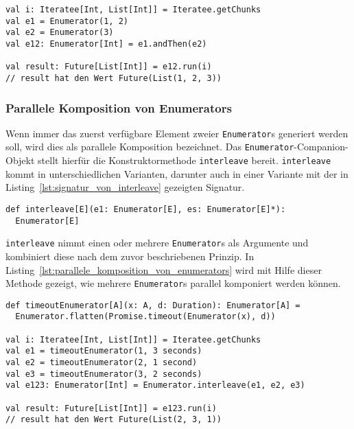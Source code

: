 \begin{lstlisting}[caption=Sequentielle Komposition von Enumerators, label=lst:sequentielle_komposition_von_enumerators]
val i: Iteratee[Int, List[Int]] = Iteratee.getChunks
val e1 = Enumerator(1, 2)
val e2 = Enumerator(3)
val e12: Enumerator[Int] = e1.andThen(e2)

val result: Future[List[Int]] = e12.run(i)
// result hat den Wert Future(List(1, 2, 3))
\end{lstlisting}


\subsubsection{Parallele Komposition von Enumerators} %
\label{ssub:anwendung_parallele_komposition_von_enumerators}

Wenn immer das zuerst verfügbare Element zweier \lstinline|Enumerator|s generiert werden soll, wird dies als parallele Komposition bezeichnet.
Das \lstinline|Enumerator|-Companion-Objekt stellt hierfür die Konstruktormethode \lstinline|interleave| bereit.
\lstinline|interleave| kommt in unterschiedlichen Varianten, darunter auch in einer Variante mit der in Listing~\ref{lst:signatur_von_interleave} gezeigten Signatur.

\begin{lstlisting}[caption=Die Signatur von interleave, label=lst:signatur_von_interleave]
def interleave[E](e1: Enumerator[E], es: Enumerator[E]*):
  Enumerator[E]
\end{lstlisting}

\lstinline|interleave| nimmt einen oder mehrere \lstinline|Enumerator|s als Argumente und kombiniert diese nach dem zuvor beschriebenen Prinzip.
In Listing~\ref{lst:parallele_komposition_von_enumerators} wird mit Hilfe dieser Methode gezeigt, wie mehrere \lstinline|Enumerator|s parallel komponiert werden können.

\begin{lstlisting}[caption=Parallele Komposition von Enumerators, label=lst:parallele_komposition_von_enumerators]
def timeoutEnumerator[A](x: A, d: Duration): Enumerator[A] =
  Enumerator.flatten(Promise.timeout(Enumerator(x), d))

val i: Iteratee[Int, List[Int]] = Iteratee.getChunks
val e1 = timeoutEnumerator(1, 3 seconds)
val e2 = timeoutEnumerator(2, 1 second)
val e3 = timeoutEnumerator(3, 2 seconds)
val e123: Enumerator[Int] = Enumerator.interleave(e1, e2, e3)

val result: Future[List[Int]] = e123.run(i)
// result hat den Wert Future(List(2, 3, 1))
\end{lstlisting}

